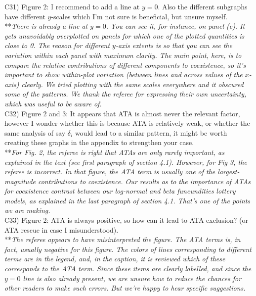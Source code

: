 \documentclass[letterpaper,11pt]{article}
\begin{document}
\noindent C31) Figure 2: I recommend to add a line at $y = 0$. Also the different subgraphs have different $y$-scales which I’m not sure is beneficial, but unsure myself. \\

\noindent ***\emph{There is already a line at $y=0$. You can see it, for instance, on panel (e). 
It gets unavoidably overplotted on panels for which one of the plotted quantities is close to 0. The reason
for different $y$-axis extents is so that you can see the variation within each panel with maximum 
clarity. The main point, here, is to compare the relative contributions of different components
to coexistence, so it's important to show within-plot variation (between lines and across 
values of the $x$-axis) clearly. We tried plotting with the same scales everywhere and it obscured some of the 
patterns. We thank the referee for expressing their own uncertainty, which was
useful to be aware of.} \\

\noindent C32) Figure 2 and 3: It appears that ATA is almost never the relevant factor, however I wonder whether this is because ATA is relatively weak, or whether the same analysis of say $\delta_i$ would lead to a similar pattern, it might be worth creating these graphs in the appendix to strengthen your case. \\

\noindent ***\emph{For Fig. 2, the referee is right that ATAs are only rarely important, as explained in the text 
(see first paragraph of section 4.1). However, for Fig 3, the referee is incorrect. In that figure, the ATA term
is usually one of the largest-magnitude contributions to coexistence. Our results as to the importance of ATAs for coexistence 
contrast between our log-normal and beta funcundities lottery models, as explained in the last paragraph
of section 4.1. That's one of the points we are making.} \\

\noindent C33) Figure 2: ATA is always positive, so how can it lead to ATA exclusion? (or ATA rescue in case I misunderstood). \\

\noindent ***\emph{The referee appears to have misinterpreted the figure. The ATA terms is, in fact, usually
negative for this figure. The colors of lines corresponding to different terms are in the legend, and, in the caption,
it is reviewed which of these corresponds to the ATA term. Since these items are clearly labelled, and since 
the $y=0$ line is also already present, we are unsure how to reduce the chances for other readers to make
such errors. But we're happy to hear specific suggestions.} \\
\end{document}
